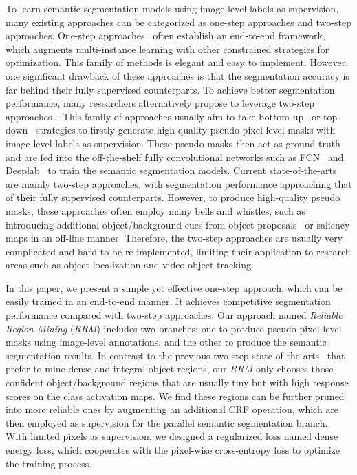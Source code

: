 \documentclass[letterpaper]{article} \usepackage{aaai20}  \usepackage{times}  \usepackage{helvet} \usepackage{courier}  \usepackage[hyphens]{url}  \usepackage{graphicx} \urlstyle{rm} \def\UrlFont{\rm}  \usepackage{graphicx}  \frenchspacing  \setlength{\pdfpagewidth}{8.5in}  \setlength{\pdfpageheight}{11in}
\begin{document}
To learn semantic segmentation models using image-level labels as supervision, many existing approaches can be categorized as one-step approaches and two-step approaches. One-step approaches~\cite{papandreou1502weakly} often establish an end-to-end framework, which augments multi-instance learning with other constrained strategies for optimization. This family of methods is elegant and easy to implement. However, one significant drawback of these approaches is that the segmentation accuracy is far behind their fully supervised counterparts. To achieve better segmentation performance, many researchers alternatively propose to leverage two-step approaches~\cite{wei2017object,huang2018weakly}. This family of approaches usually aim to take bottom-up~\cite{hou2017deeply} or top-down~\cite{zhang2018top,zhou2016learning} strategies to firstly generate high-quality pseudo pixel-level masks with image-level labels as supervision. These pseudo masks then act as ground-truth and are fed into the off-the-shelf fully convolutional networks such as FCN~\cite{long2015fully} and Deeplab~\cite{chen2014semantic,chen2018deeplab} to train the semantic segmentation models. Current state-of-the-arts are mainly two-step approaches, with segmentation performance approaching that of their fully supervised counterparts. However, to produce high-quality pseudo masks, these approaches often employ many bells and whistles, such as introducing additional object/background cues from object proposals~\cite{pinheiro2015image} or saliency maps \cite{jiang2013salient} in an off-line manner. Therefore, the two-step approaches are usually very complicated and hard to be re-implemented, limiting their application to research areas such as object localization and video object tracking. 

In this paper, we present a simple yet effective one-step approach, which can be easily trained in an end-to-end manner. It achieves competitive segmentation performance compared with two-step approaches. Our approach named \emph{Reliable Region Mining} (\emph{RRM}) includes two branches: one to produce pseudo pixel-level masks using image-level annotations, and the other to produce the semantic segmentation results. In contrast to the previous two-step state-of-the-arts~\cite{ahn2018learning,lee2019ficklenet} that prefer to mine dense and integral object regions, our \emph{RRM} only chooses those confident object/background regions that are usually tiny but with high response scores on the class activation maps. We find these regions can be further pruned into more reliable ones by augmenting an additional CRF operation, which are then employed as supervision for the parallel semantic segmentation branch. With limited pixels as supervision, we designed a regularized loss named dense energy loss, which cooperates with the pixel-wise cross-entropy loss to optimize the training process. 
\end{document}
